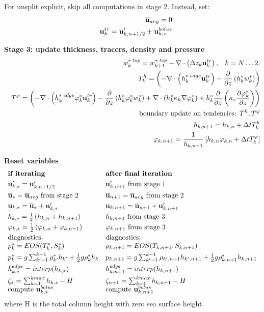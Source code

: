 \documentclass[11pt]{report}
\newcommand{\bea}{\begin{eqnarray}}
\newcommand{\eea}{\end{eqnarray}}
\begin{document}
For unsplit explicit, skip all computations in stage 2.  Instead, set:
\bea
&&
\ubtr_{avg} = 0 \\ &&
{\bf u}^{tr}_{k} = {\bf u}'_{k,n+1/2} + {\bf u}_{k,*}^{bolus}
\eea

\newpage
{\bf Stage 3: update thickness, tracers, density and pressure}
\bea &&
\label{w3}
w^{*\; top}_k 
= w^{*\; top}_{k+1} 
- \nabla \cdot \left( \Delta z_k {\bf u}^{tr}_k \right), \;\;\; k=N\ldots 2.
\\&&
T^h_k = \left(  - \nabla \cdot \left( h_k^{*\; edge} {\bf u}_k^{tr} \right)  
- \frac{\partial}{\partial z} \left( h_k^* w_k^* \right)  \right)
\\ && 
T^\varphi %
= \left(  - \nabla \cdot \left( h_k^{*\; edge}\varphi_k^* {\bf u}_k^{tr} \right)  
- \frac{\partial}{\partial z} \left( h_k^*\varphi_k^* w_k^* \right)  
+ \nabla\cdot\left(h_k^* \kappa_h \nabla\varphi_k^* \right)
+ h_k^* \frac{\partial }{\partial z} 
  \left( \kappa_v \frac{\partial \varphi_k^*}{\partial z} \right)
\right) 
\\ &&
\mbox{boundary update on tendencies: } T^h,T^\varphi\\&& 
h_{k,n+1} = h_{k,n} +  \Delta t T^h_k \\&& 
\label{phi3}
{\varphi}_{k,n+1} = \frac{1}{h_{k,n+1}} \left[
h_{k,n} \varphi_{k,n} 
+ \Delta t T^\varphi_k \right]
\label{phi}
\eea

{\bf Reset variables}
\bea 
\begin{array}{ll}
\mbox{\bf if iterating} & \mbox{\bf after final iteration}\smallskip\\
{\bf u}'_{k,*} = {\bf u}'_{k,n+1/2} & {\bf u}'_{k,n+1} \mbox{ from stage 1}\smallskip\\
\ubtr_{*} = \ubtr_{avg} \mbox{ from stage 2} & \ubtr_{n+1} = \ubtr_{avg} \mbox{ from stage 2}\smallskip\\
{\bf u}_{k,*} = \ubtr_{*} + {\bf u}'_{k,*} & {\bf u}_{k,n+1} = \ubtr_{n+1} + {\bf u}'_{k,n+1}\smallskip\\
h_{k,*} = \frac{1}{2}\left(h_{k,n} +h_{k,n+1}\right)  
 & h_{k,n+1} \mbox{ from stage 3} \smallskip\\
\varphi_{k,*} = \frac{1}{2}\left(\varphi_{k,n} +\varphi_{k,n+1}\right)
 & \varphi_{k,n+1} \mbox{ from stage 3} \smallskip\\
\mbox{diagnostics:}
& \mbox{diagnostics:} \\
{\rho}_k^* = EOS(T^*_k, S^*_k) 
 & {\rho}_{k,n+1} = EOS(T_{k,n+1}, S_{k,n+1}) \smallskip\\
\label{p3}
{p}_k^* =  g\sum_{k'=1}^{k-1} 
{\rho}_{k'}^* h_{k'}
+ \frac{1}{2}g{\rho}_{k}^* h_k
 & {p}_{k,n+1} =  g\sum_{k'=1}^{k-1} 
{\rho}_{k',n+1} h_{k',n+1}
+ \frac{1}{2}g{\rho}_{k,n+1}^* h_{k,n+1} \smallskip \\
h^{edge}_{k,*} = interp(h_{k,*}) & 
h^{edge}_{k,n+1} = interp(h_{k,n+1}) \smallskip\\
\zeta_* = \sum_{k=1}^{kmax}h_{k,*} - H &
\zeta_{n+1} = \sum_{k=1}^{kmax}h_{k,n+1} - H \\
\mbox{compute }{\bf u}_{k,*}^{bolus} &
\mbox{compute }{\bf u}_{k,n+1}^{bolus} 
\end{array}
\eea
where H is the total column height with zero sea surface height.
\end{document}
